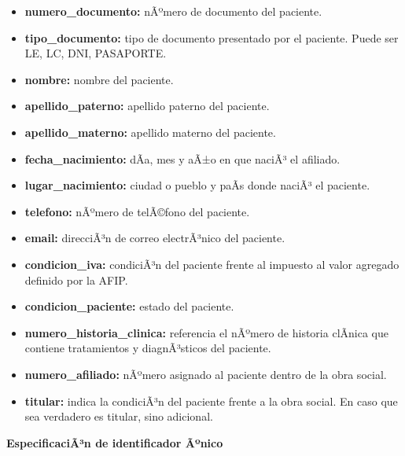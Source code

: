\documentclass[a4paper,11pt]{article}
\begin{document}
\begin{itemize}

   \item \textbf{numero\_documento:} nÃºmero de documento del paciente.

   \item \textbf{tipo\_documento:} tipo de documento presentado por el paciente. Puede ser 
   LE, LC, DNI, PASAPORTE.

   \item \textbf{nombre:} nombre del paciente.

   \item \textbf{apellido\_paterno:} apellido paterno del paciente.

   \item \textbf{apellido\_materno:} apellido materno del paciente.

   \item \textbf{fecha\_nacimiento:} dÃ­a, mes y aÃ±o en que naciÃ³ el afiliado.

   \item \textbf{lugar\_nacimiento:} ciudad o pueblo y paÃ­s donde naciÃ³ el paciente.

   \item \textbf{telefono:} nÃºmero de telÃ©fono del paciente.

   \item \textbf{email:} direcciÃ³n de correo electrÃ³nico del paciente.

   \item \textbf{condicion\_iva:} condiciÃ³n del paciente frente al impuesto al valor agregado 
   definido por la AFIP.

   \item \textbf{condicion\_paciente:} estado del paciente.

   \item \textbf{numero\_historia\_clinica:} referencia el nÃºmero de historia clÃ­nica que 
   contiene tratamientos y diagnÃ³sticos del paciente.

   \item \textbf{numero\_afiliado:} nÃºmero asignado al paciente dentro de la obra social.

   \item \textbf{titular:} indica la condiciÃ³n del paciente frente a la obra social. En caso que sea verdadero 
   es titular, sino adicional.
\end{itemize}

\textbf{EspecificaciÃ³n de identificador Ãºnico}
\end{document}
